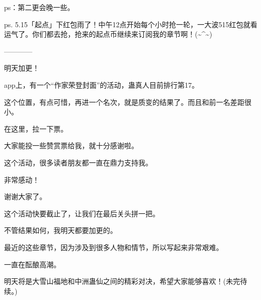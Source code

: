 \begin{this_body}
ps：第二更会晚一些。

ps. 5.15「起点」下红包雨了！中午12点开始每个小时抢一轮，一大波515红包就看运气了。你们都去抢，抢来的起点币继续来订阅我的章节啊！(\~{}\^{}\~{})

------------

明天加更！

app上，有一个“作家荣登封面”的活动，蛊真人目前排行第17。

这个位置，有点可惜，再进一个名次，就是质变的结果了。而且和前一名差距很小。

在这里，拉一下票。

大家能投一些赞赏票给我，就十分感谢啦。

这个活动，很多读者朋友都一直在鼎力支持我。

非常感动！

谢谢大家了。

这个活动快要截止了，让我们在最后关头拼一把。

不管结果如何，我明天都要加更的。

最近的这些章节，因为涉及到很多人物和情节，所以写起来非常艰难。

一直在酝酿高潮。

明天将是大雪山福地和中洲蛊仙之间的精彩对决，希望大家能够喜欢！(未完待续。)

\end{this_body}

